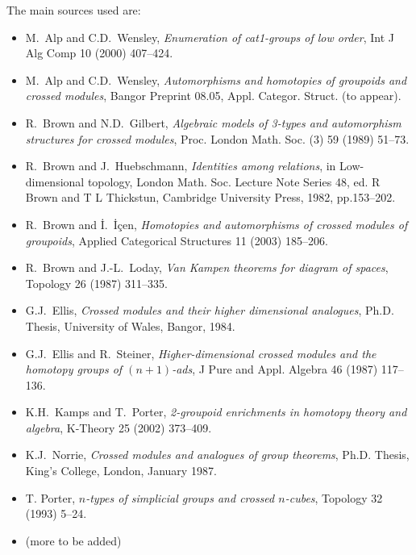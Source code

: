 \bigskip
The main sources used are:
\begin{itemize}
\item
M.~Alp and C.D.~Wensley,
\emph{Enumeration of cat1-groups of low order},
Int J Alg Comp 10 (2000) 407--424.

\item
M.~Alp and C.D.~Wensley,
\emph{Automorphisms and homotopies of groupoids and crossed modules},
Bangor Preprint 08.05, Appl. Categor. Struct. (to appear).

\item
R.~Brown and N.D.~Gilbert,
\emph{Algebraic models of 3-types and automorphism
structures for crossed modules},
Proc. London Math. Soc. (3) 59 (1989) 51--73.
\item
R.~Brown and J.~Huebschmann, \emph{Identities among relations},
in Low-dimensional topology, London Math. Soc. Lecture Note Series 48,
ed. R Brown and T L Thickstun, Cambridge University Press, 1982, pp.153--202.

\item
R.~Brown and  \.{I}.~\.{I}\c{c}en,
\emph{Homotopies and automorphisms of crossed modules of groupoids},
Applied Categorical Structures 11 (2003) 185--206.

\item
R.~Brown and  J.-L.~Loday,
\emph{Van Kampen theorems for diagram of spaces},
Topology 26 (1987) 311--335.

\item
G.J.~Ellis, 
\emph{Crossed modules and their higher dimensional analogues},
Ph.D. Thesis, University of Wales, Bangor, 1984.

\item
G.J.~Ellis and R.~Steiner,
\emph{Higher-dimensional crossed modules and the
homotopy groups of $(n+1)$-ads},
J Pure and Appl. Algebra 46 (1987) 117--136.

\item
K.H.~Kamps and T.~Porter,
\emph{2-groupoid enrichments in homotopy theory and algebra},
K-Theory 25 (2002) 373--409.

\item
K.J.~Norrie, 
\emph{Crossed modules and analogues of group theorems},
Ph.D. Thesis, King's College, London, January 1987.

\item
T. Porter,
\emph{$n$-types of simplicial groups and crossed $n$-cubes},
Topology 32 (1993) 5--24.

\item
(more to be added)
\end{itemize}
